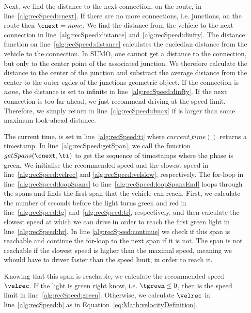 Next, we find the distance to the next connection, \cnext on the route, \route in line~\ref{alg:recSpeed:cnext}. 
If there are no more connections, i.e. junctions, on the route then $\cnext=none$.
We find the distance from the vehicle to the next connection in line~\ref{alg:recSpeed:distance} and~\ref{alg:recSpeed:dinfty}.
The distance function on line~\ref{alg:recSpeed:distance} calculates the eucledian distance from the vehicle to the connection.
In SUMO, one cannot get a distance to the connection, but only to the center point of the associated junction.
We therefore calculate the distance to the center of the junction and substract the average distance from the center to the outer egdes of the junctions geometric object. %
If the connection is $none$, the distance is set to infinite in line~\ref{alg:recSpeed:dinfty}.
If the next connection is too far ahead, we just recommend driving at the speed limit. 
Therefore, we simply return \velmax in line~\ref{alg:recSpeed:dmax} if \dist is larger than some maximum look-ahead distance.

The current time, \ti is set in line~\ref{alg:recSpeed:ti} where $current\_time()$ returns a timestamp.
In line~\ref{alg:recSpeed:getSpan}, we call the function $getSpans(\cnext, \ti)$ to get the sequence of timestamps where the phase is green.
We initialise the recommended speed and the slowest speed in line~\ref{alg:recSpeed:velrec} and \ref{alg:recSpeed:velslow}, respectively.
The for-loop in line~\ref{alg:recSpeed:loopSpans} to line~\ref{alg:recSpeed:loopSpansEnd} loops through the spans and finds the first span that the vehicle can reach.
First, we calculate the number of seconds before the light turns green and red in line~\ref{alg:recSpeed:tg} and~\ref{alg:recSpeed:tr}, respectively, and then calculate the slowest speed at which we can drive in order to reach the first green light in line~\ref{alg:recSpeed:hr}.
In line \ref{alg:recSpeed:continue} we check if this span is reachable and continue the for-loop to the next span if it is not. 
The span is not reachable if the slowest speed is higher than the maximal speed, meaning we whould have to driver faster than the speed limit, in order to reach it.

Knowing that this span is reachable, we calculate the recommended speed $\velrec$.
If the light is green right know, i.e. $\tgreen \leq 0$, then \velrec is the speed limit in line~\ref{alg:recSpeed:green}. 
Otherwise, we calculate $\velrec$ in line~\ref{alg:recSpeed:h} as in Equation~\ref{eq:Math:velocityDefinition}.

